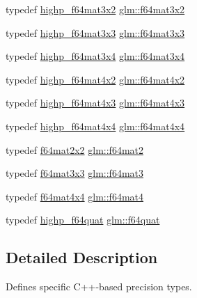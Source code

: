 \begin{DoxyCompactItemize}
\item 
typedef \hyperlink{group__gtc__type__precision_ga5cdc9d6fb9ce07e5485c4e2db919ce7e}{highp\+\_\+f64mat3x2} \hyperlink{group__gtc__type__precision_gae6388c7664b5bb281047a9fd7984f97b}{glm\+::f64mat3x2}
\item 
typedef \hyperlink{group__gtc__type__precision_gaf520a9307867c632408029a53af3e375}{highp\+\_\+f64mat3x3} \hyperlink{group__gtc__type__precision_gad74db0197015b8d1d77ce54cf8d0ae60}{glm\+::f64mat3x3}
\item 
typedef \hyperlink{group__gtc__type__precision_ga4144f547189dd7e52b4dd282f41a1cd1}{highp\+\_\+f64mat3x4} \hyperlink{group__gtc__type__precision_gac9468e5fa519d06b452d3126bb22a597}{glm\+::f64mat3x4}
\item 
typedef \hyperlink{group__gtc__type__precision_gabe9bc3680e7d83a7b34297da518a8117}{highp\+\_\+f64mat4x2} \hyperlink{group__gtc__type__precision_gae716a8717cc6af191aec562d93ff6299}{glm\+::f64mat4x2}
\item 
typedef \hyperlink{group__gtc__type__precision_ga0264562b4667b8073b7708efc2280691}{highp\+\_\+f64mat4x3} \hyperlink{group__gtc__type__precision_gaca283f88500d9895afb939516e7372d1}{glm\+::f64mat4x3}
\item 
typedef \hyperlink{group__gtc__type__precision_gaa95b52552df369b75d09155ebb29b1bd}{highp\+\_\+f64mat4x4} \hyperlink{group__gtc__type__precision_ga37a1ae1f6e67b5a6a06b1ee7c83f4bec}{glm\+::f64mat4x4}
\item 
typedef \hyperlink{group__gtc__type__precision_gad125d405392e76f26f359798350fb64f}{f64mat2x2} \hyperlink{group__gtc__type__precision_gaa66040c1fd82a9d1f6ac82d4e1e8baa6}{glm\+::f64mat2}
\item 
typedef \hyperlink{group__gtc__type__precision_gad74db0197015b8d1d77ce54cf8d0ae60}{f64mat3x3} \hyperlink{group__gtc__type__precision_gaa9e69ab90c0130b9a84a0a7fd8e49664}{glm\+::f64mat3}
\item 
typedef \hyperlink{group__gtc__type__precision_ga37a1ae1f6e67b5a6a06b1ee7c83f4bec}{f64mat4x4} \hyperlink{group__gtc__type__precision_ga1e2d73ea989e6a5abd90cbe9f1025a41}{glm\+::f64mat4}
\item 
typedef \hyperlink{group__gtc__type__precision_ga9372e8b60f401fd94aba637b3ed17cfc}{highp\+\_\+f64quat} \hyperlink{group__gtc__type__precision_ga860589eddc4ff95795a858318652b6ff}{glm\+::f64quat}
\end{DoxyCompactItemize}


\subsection{Detailed Description}
Defines specific C++-\/based precision types. 

